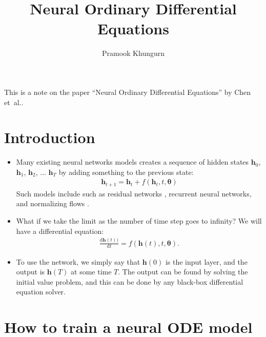 \documentclass[10pt]{article}
\title{Neural Ordinary Differential Equations}
\author{Pramook Khungurn}
\newcommand{\dee}{\mathrm{d}}
\newcommand{\ve}[1]{\mathbf{#1}}
\newcommand{\ves}[1]{\boldsymbol{#1}}
\newcommand{\etal}{{et~al.}}
\begin{document}
\maketitle

This is a note on the paper ``Neural Ordinary Differential Equations'' by Chen \etal \cite{Chen:2018}.

\section{Introduction}

\begin{itemize}
  \item Many existing neural networks models creates a sequence of hidden states $\ve{h}_0$, $\ve{h}_1$, $\ve{h}_2$, $\dotsc$ $\ve{h}_T$ by adding something to the previous state:
  \begin{align*}
    \ve{h}_{t+1} = \ve{h}_t + f(\ve{h}_t, t, \ves{\theta})
  \end{align*}
  Such models include such as residual networks \cite{He:2015}, recurrent neural networks, and normalizing flows \cite{Rezende:2015,Dinh:2014}.

  \item What if we take the limit as the number of time step goes to infinity? We will have a differential equation:
  \begin{align*}
    \frac{\dee\ve{h}(t))}{\dee t} = f(\ve{h}(t), t, \ves{\theta}).
  \end{align*}

  \item To use the network, we simply say that $\ve{h}(0)$ is the input layer, and the output is $\ve{h}(T)$ at some time $T$. The output can be found by solving the initial value problem, and this can be done by any black-box differential equation solver. 
\end{itemize}

\section{How to train a neural ODE model}
\end{document}
